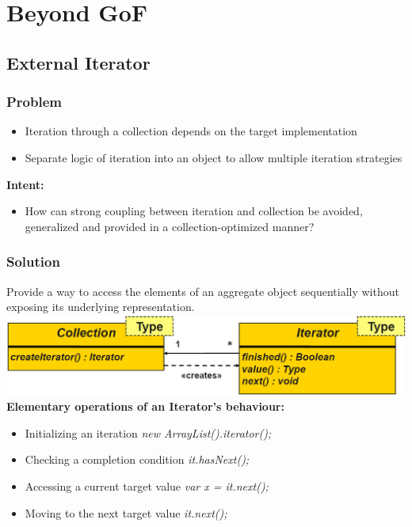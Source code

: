\section{Beyond GoF}
\subsection{External Iterator}
\subsubsection{Problem}
\begin{itemize}
    \item Iteration through a collection depends on the target implementation
    \item Separate logic of iteration into an object to allow multiple iteration strategies
\end{itemize}
\textbf{Intent:}
\begin{itemize}
    \item How can strong coupling between iteration and collection be avoided, generalized and provided in a collection-optimized manner?
\end{itemize}
\subsubsection{Solution}
Provide a way to access the elements of an aggregate object sequentially without exposing its underlying representation.\\ 
\includegraphics[width=\linewidth]{./img/external_iterator.png}
\textbf{Elementary operations of an Iterator's behaviour:}
\begin{itemize}
    \item Initializing an iteration \textit{new ArrayList().iterator();}
    \item Checking a completion condition \textit{it.hasNext();}
    \item Accessing a current target value \textit{var x = it.next();}
    \item Moving to the next target value \textit{it.next();}
\end{itemize}
